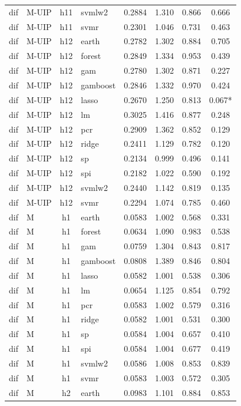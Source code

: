 \begin{ThreePartTable}
\begin{longtable}[t]{llclcccc}
dif & M-UIP & h11 & svmlw2 & 0.2884 & 1.310 & 0.866 & 0.666\\
dif & M-UIP & h11 & svmr & 0.2301 & 1.046 & 0.731 & 0.463\\
\addlinespace
dif & M-UIP & h12 & earth & 0.2782 & 1.302 & 0.884 & 0.705\\
dif & M-UIP & h12 & forest & 0.2849 & 1.334 & 0.953 & 0.439\\
dif & M-UIP & h12 & gam & 0.2780 & 1.302 & 0.871 & 0.227\\
dif & M-UIP & h12 & gamboost & 0.2846 & 1.332 & 0.970 & 0.424\\
dif & M-UIP & h12 & lasso & 0.2670 & 1.250 & 0.813 & 0.067*\\
dif & M-UIP & h12 & lm & 0.3025 & 1.416 & 0.877 & 0.248\\
dif & M-UIP & h12 & pcr & 0.2909 & 1.362 & 0.852 & 0.129\\
dif & M-UIP & h12 & ridge & 0.2411 & 1.129 & 0.782 & 0.120\\
dif & M-UIP & h12 & sp & 0.2134 & 0.999 & 0.496 & 0.141\\
dif & M-UIP & h12 & spi & 0.2182 & 1.022 & 0.590 & 0.192\\
dif & M-UIP & h12 & svmlw2 & 0.2440 & 1.142 & 0.819 & 0.135\\
dif & M-UIP & h12 & svmr & 0.2294 & 1.074 & 0.785 & 0.460\\
\addlinespace
dif & M & h1 & earth & 0.0583 & 1.002 & 0.568 & 0.331\\
dif & M & h1 & forest & 0.0634 & 1.090 & 0.983 & 0.538\\
dif & M & h1 & gam & 0.0759 & 1.304 & 0.843 & 0.817\\
dif & M & h1 & gamboost & 0.0808 & 1.389 & 0.846 & 0.804\\
dif & M & h1 & lasso & 0.0582 & 1.001 & 0.538 & 0.306\\
dif & M & h1 & lm & 0.0654 & 1.125 & 0.854 & 0.792\\
dif & M & h1 & pcr & 0.0583 & 1.002 & 0.579 & 0.316\\
dif & M & h1 & ridge & 0.0582 & 1.001 & 0.531 & 0.300\\
dif & M & h1 & sp & 0.0584 & 1.004 & 0.657 & 0.410\\
dif & M & h1 & spi & 0.0584 & 1.004 & 0.677 & 0.419\\
dif & M & h1 & svmlw2 & 0.0586 & 1.008 & 0.853 & 0.839\\
dif & M & h1 & svmr & 0.0583 & 1.003 & 0.572 & 0.305\\
\addlinespace
dif & M & h2 & earth & 0.0983 & 1.101 & 0.884 & 0.853\\

\end{longtable}
\end{ThreePartTable}
